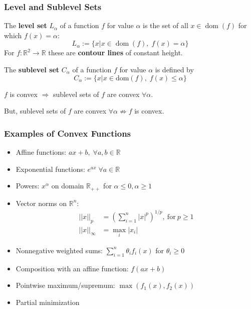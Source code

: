 \subsubsection{Level and Sublevel Sets}
The \textbf{level set} $L_{\alpha}$ of a function $f$ for value $\alpha$ is the set of all $x \in \operatorname{dom}(f)$ for which $f(x) = \alpha$:
\begin{equation*}
    L_{\alpha} := \{ x | x \in \operatorname{dom}(f),\; f(x) = \alpha \}
\end{equation*}
\newpar{}
For $f:\mathbb{R}^2 \to \mathbb{R}$ these are \textbf{contour lines} of constant height.

The \textbf{sublevel set} $C_{\alpha}$ of a function $f$ for value $\alpha$ is defined by
\begin{equation*}
    C_{\alpha} := \{x | x \in \text{dom}(f),\; f(x) \leq \alpha\}
\end{equation*}

\newpar{}
$f$ is convex $\Rightarrow$ sublevel sets of $f$ are convex $\forall \alpha$.

But, sublevel sets of $f$ are convex $\forall \alpha \nRightarrow f$ is convex.

\subsubsection{Examples of Convex Functions}
\begin{itemize}
    \item Affine functions: $ ax + b,\; \forall a,b\in \mathbb{R}$
    \item Exponential functions: $e^{ax}\; \forall a\in \mathbb{R}$
    \item Powers: $x^\alpha$ on domain $\mathbb{R}_{++}$ for $\alpha \leq 0, \alpha \geq1$
    \item Vector norms on $\mathbb{R}^n$:
          \begin{align*}
              ||x||_p      & ={(\sum_{i=1}^n|x|^p)}^{1/p},\mathrm{~for~}p\geq1 \\
              ||x||_\infty & =\max_i|x_i|
          \end{align*}
\end{itemize}
\newpar{}
\begin{itemize}
    \item Nonnegative weighted sums: $\sum_{i=1}^{n} \theta_i f_i(x)$ for $\theta_i \geq 0$
    \item Composition with an affine function: $f(ax+b)$
    \item Pointwise maximum/supremum: $\max(f_1(x),f_2(x))$
    \item Partial minimization
\end{itemize}

